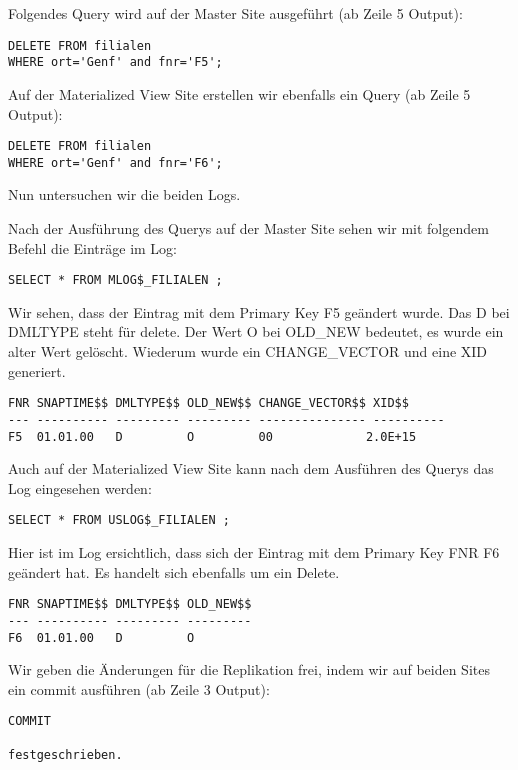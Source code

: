 \documentclass[11pt,a4paper,parskip=half]{scrartcl}
\begin{document}
Folgendes Query wird auf der Master Site ausgeführt (ab Zeile 5 Output):
\begin{lstlisting}
DELETE FROM filialen
WHERE ort='Genf' and fnr='F5'; 

\end{lstlisting}

Auf der Materialized View Site erstellen wir ebenfalls ein Query (ab Zeile 5 Output):
\begin{lstlisting}
DELETE FROM filialen
WHERE ort='Genf' and fnr='F6'; 

\end{lstlisting}

Nun untersuchen wir die beiden Logs.

Nach der Ausführung des Querys auf der Master Site sehen wir mit folgendem Befehl die Einträge im Log:
\begin{lstlisting}
SELECT * FROM MLOG$_FILIALEN ;
\end{lstlisting}

Wir sehen, dass der Eintrag mit dem Primary Key F5 geändert wurde. Das D bei DMLTYPE steht für delete. Der Wert O bei OLD\_NEW bedeutet, es wurde ein alter Wert gelöscht. Wiederum wurde ein CHANGE\_VECTOR und eine XID generiert.
\begin{lstlisting}
FNR SNAPTIME$$ DMLTYPE$$ OLD_NEW$$ CHANGE_VECTOR$$ XID$$
--- ---------- --------- --------- --------------- ----------
F5  01.01.00   D         O         00             2.0E+15 
\end{lstlisting}

Auch auf der Materialized View Site kann nach dem Ausführen des Querys das Log eingesehen werden:
\begin{lstlisting}
SELECT * FROM USLOG$_FILIALEN ;
\end{lstlisting}

Hier ist im Log ersichtlich, dass sich der Eintrag mit dem Primary Key FNR F6 geändert hat. Es handelt sich ebenfalls um ein Delete.
\begin{lstlisting}
FNR SNAPTIME$$ DMLTYPE$$ OLD_NEW$$
--- ---------- --------- ---------
F6  01.01.00   D         O         
\end{lstlisting}

Wir geben die Änderungen für die Replikation frei, indem wir auf beiden Sites ein commit ausführen (ab Zeile 3 Output):
\begin{lstlisting}
COMMIT

festgeschrieben.
\end{lstlisting}
\end{document}
